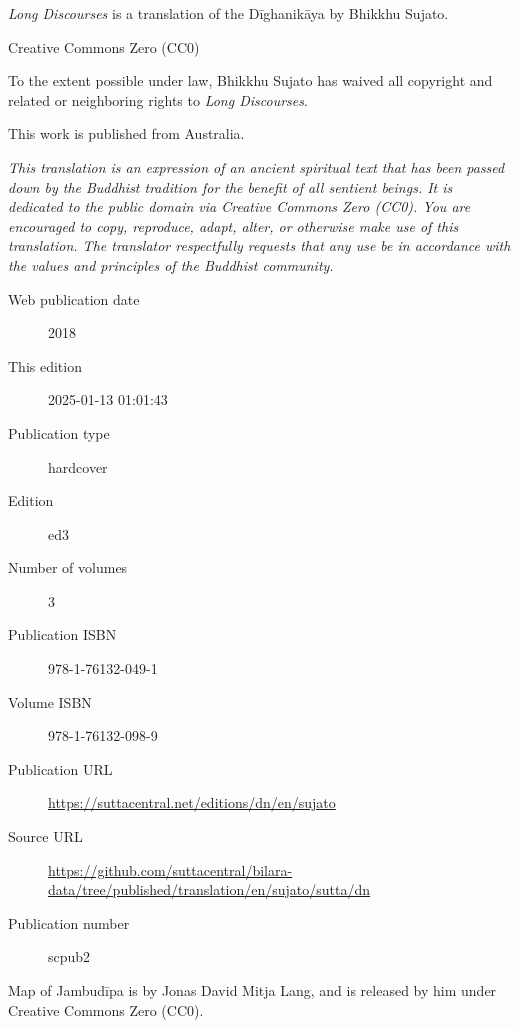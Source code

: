 \documentclass[12pt,openany]{book}%
\begin{document}
\begin{footnotesize}

\textit{Long Discourses} is a translation of the Dīghanikāya by Bhikkhu Sujato.

\medskip

Creative Commons Zero (CC0)

To the extent possible under law, Bhikkhu Sujato has waived all copyright and related or neighboring rights to \textit{Long Discourses}.

\medskip

This work is published from Australia.

\begin{center}
\textit{This translation is an expression of an ancient spiritual text that has been passed down by the Buddhist tradition for the benefit of all sentient beings. It is dedicated to the public domain via Creative Commons Zero (CC0). You are encouraged to copy, reproduce, adapt, alter, or otherwise make use of this translation. The translator respectfully requests that any use be in accordance with the values and principles of the Buddhist community.}
\end{center}

\medskip

\begin{description}
    \item[Web publication date] 2018
    \item[This edition] 2025-01-13 01:01:43
    \item[Publication type] hardcover
    \item[Edition] ed3
    \item[Number of volumes] 3
    \item[Publication ISBN] 978-1-76132-049-1
    \item[Volume ISBN] 978-1-76132-098-9
    \item[Publication URL] \href{https://suttacentral.net/editions/dn/en/sujato}{https://suttacentral.net/editions/dn/en/sujato}
    \item[Source URL] \href{https://github.com/suttacentral/bilara-data/tree/published/translation/en/sujato/sutta/dn}{https://github.com/suttacentral/bilara-data/tree/published/translation/en/sujato/sutta/dn}
    \item[Publication number] scpub2
\end{description}

\medskip

Map of Jambudīpa is by Jonas David Mitja Lang, and is released by him under Creative Commons Zero (CC0).


\end{footnotesize}
\end{document}
